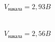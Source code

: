 \documentclass[12pt,a4paper]{article}
\begin{document}
\begin{figure}[H]
\begin{minipage}[h]{0.45\linewidth}
 $V_\text{накала} = 2,93B$ \\
\end{minipage}
\hfill
\begin{minipage}[h]{0.45\linewidth}
 \\ $V_\text{накала} = 2,56B$
\end{minipage}
\end{figure}
\end{document}
